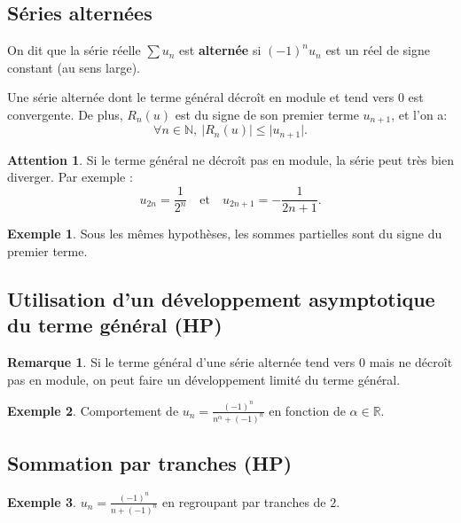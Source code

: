 \documentclass[french]{article}
\newcommand{\N}{\mathbb{N}}
\newcommand{\R}{\mathbb{R}}
\theoremstyle{plain}
\theoremstyle{definition}
\newtheorem*{ex}{Exemple}
\newtheorem*{rmq}{Remarque}
\newtheorem*{attention}{Attention}
\theoremstyle{remark}
\begin{document}
\subsection{Séries alternées}

\begin{dfn}
	On dit que la série réelle $\displaystyle\sum u_n$ est \textbf{alternée} si $(-1)^nu_n$ est un réel de signe constant (au sens large).
\end{dfn}

\begin{thm}%
	Une série alternée dont le terme général décroît en module et tend vers $0$ est convergente. De plus, $R_n(u)$ est du signe de son premier terme $u_{n+1}$, et l'on a: $$\forall n\in\N,\ \lvert R_n(u)\rvert\leqslant\lvert u_{n+1}\rvert.$$
\end{thm}

\begin{attention}
	Si le terme général ne décroît pas en module, la série peut très bien diverger. Par exemple : $$u_{2n}=\frac{1}{2^n}\quad \text{et}\quad u_{2n+1}=-\frac{1}{2n+1}.$$
\end{attention}

\begin{ex}
	Sous les mêmes hypothèses, les sommes partielles sont du signe du premier terme.
\end{ex}

\subsection{Utilisation d'un développement asymptotique du terme général (HP)}

\begin{rmq}
	Si le terme général d'une série alternée tend vers $0$ mais ne décroît pas en module, on peut faire un développement limité du terme général.
\end{rmq}

\begin{ex}
	Comportement de $u_n=\displaystyle\frac{(-1)^n}{n^\alpha+(-1)^n}$ en fonction de $\alpha\in\R$.
\end{ex}

\subsection{Sommation par tranches (HP)}

\begin{ex}
	$u_n=\displaystyle\frac{(-1)^n}{n+(-1)^n}$ en regroupant par tranches de $2$.
\end{ex}
\end{document}
